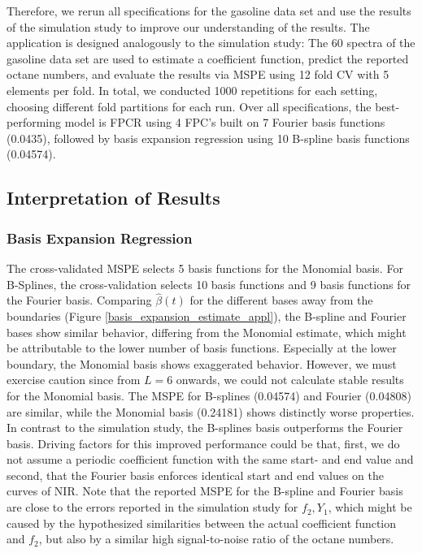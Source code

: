 \documentclass[11pt,twoside,a4paper]{article}
\begin{document}
		Therefore, we rerun all specifications for the gasoline data set and use the results of the simulation study to improve our understanding of the results. The application is designed analogously to the simulation study: The 60 spectra of the gasoline data set are used to estimate a coefficient function, predict the reported octane numbers, and evaluate the results via MSPE using 12 fold CV with 5 elements per fold. In total, we conducted 1000 repetitions for each setting, choosing different fold partitions for each run. Over all specifications, the best-performing model is FPCR using 4 FPC's built on 7 Fourier basis functions (0.0435), followed by basis expansion regression using 10 B-spline basis functions (0.04574).
		

		
	\subsection{Interpretation of Results}
		\subsubsection{Basis Expansion Regression}
		The cross-validated MSPE selects 5 basis functions for the Monomial basis. For B-Splines, the cross-validation selects 10 basis functions and 9 basis functions for the Fourier basis. Comparing $\hat{\beta}(t)$ for the different bases away from the boundaries (Figure \ref{basis_expansion_estimate_appl}), the B-spline and Fourier bases show similar behavior, differing from the Monomial estimate, which might be attributable to the lower number of basis functions. Especially at the lower boundary, the Monomial basis shows exaggerated behavior. However, we must exercise caution since from $L=6$ onwards, we could not calculate stable results for the Monomial basis. The MSPE for B-splines (0.04574) and Fourier (0.04808) are similar, while the Monomial basis (0.24181) shows distinctly worse properties. 
		In contrast to the simulation study, the B-splines basis outperforms the Fourier basis. Driving factors for this improved performance could be that, first, we do not assume a periodic coefficient function with the same start- and end value and second, that the Fourier basis enforces identical start and end values on the curves of NIR. Note that the reported MSPE for the B-spline and Fourier basis are close to the errors reported in the simulation study for $f_2,Y_1$, which might be caused by the hypothesized similarities between the actual coefficient function and $f_2$, but also by a similar high signal-to-noise ratio of the octane numbers. 
	
\end{document}
